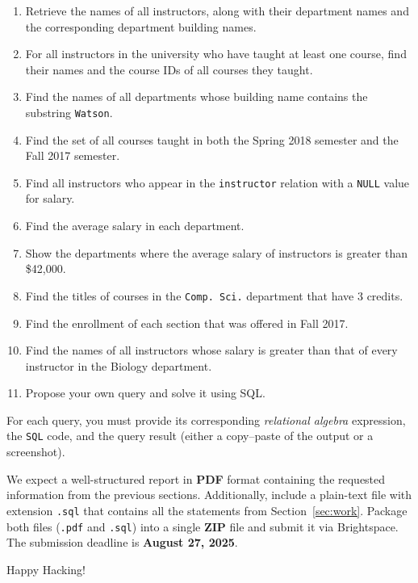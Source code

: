 \documentclass{article}
\begin{document}
\begin{enumerate}
  \item Retrieve the names of all instructors, along with their department names and the corresponding department building names.
  \item For all instructors in the university who have taught at least one course, find their names and the course IDs of all courses they taught.
  \item Find the names of all departments whose building name contains the substring \texttt{Watson}.
  \item Find the set of all courses taught in both the Spring 2018 semester and the Fall 2017 semester.
  \item Find all instructors who appear in the \texttt{instructor} relation with a \texttt{NULL} value for salary.
  \item Find the average salary in each department.
  \item Show the departments where the average salary of instructors is greater than \$42{,}000.
  \item Find the titles of courses in the \texttt{Comp. Sci.} department that have 3 credits.
  \item Find the enrollment of each section that was offered in Fall 2017.
  \item Find the names of all instructors whose salary is greater than that of every instructor in the Biology department.
  \item Propose your own query and solve it using SQL.
\end{enumerate}

For each query, you must provide its corresponding \textit{relational algebra} expression, the \texttt{SQL} code, and the query result (either a copy–paste of the output or a screenshot).

We expect a well-structured report in \textbf{PDF} format containing the requested information from the previous sections. Additionally, include a plain-text file with extension \texttt{.sql} that contains all the statements from Section~\ref{sec:work}. Package both files (\texttt{.pdf} and \texttt{.sql}) into a single \textbf{ZIP} file and submit it via Brightspace. The submission deadline is \textbf{August 27, 2025}.


\vspace{5mm}
Happy Hacking! 
\end{document}
